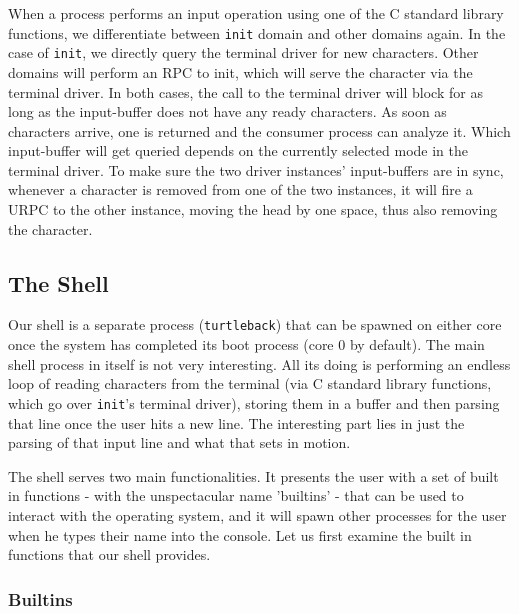 When a process performs an input operation using one of the C standard library 
functions, we differentiate between \texttt{init} domain and other domains 
again. In the case of \texttt{init}, we directly query the terminal driver for 
new characters. Other domains will perform an RPC to init, which will serve the 
character via the terminal driver. In both cases, the call to the terminal 
driver will block for as long as the input-buffer does not have any ready 
characters. As soon as characters arrive, one is returned and the consumer 
process can analyze it. Which input-buffer will get queried depends on the 
currently selected mode in the terminal driver. To make sure the two driver 
instances' input-buffers are in sync, whenever a character is removed from one 
of the two instances, it will fire a URPC to the other instance, moving the 
head by one space, thus also removing the character.

\subsection{The Shell}\label{ss:the-shell}

Our shell is a separate process (\texttt{turtleback}) that can be spawned on 
either core once the system has completed its boot process (core 0 by default).
The main shell process in itself is not very interesting. All its doing is 
performing an endless loop of reading characters from the terminal (via C 
standard library functions, which go over \texttt{init}'s terminal driver), 
storing them in a buffer and then parsing that line once the user hits a new 
line. The interesting part lies in just the parsing of that input line and what 
that sets in motion.
\medskip

The shell serves two main functionalities. It presents the user with a set of 
built in functions - with the unspectacular name 'builtins' - that can be used 
to interact with the operating system, and it will spawn other processes for 
the user when he types their name into the console. Let us first examine the 
built in functions that our shell provides.

\subsubsection{Builtins}\label{sss:shell-builtins}


